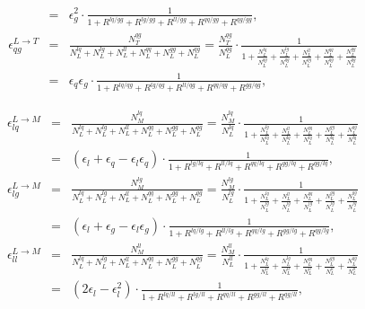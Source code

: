 \begin{eqnarray}
& = & \epsilon_{g}^{2} \cdot \frac{1}{1 + R^{lq/gg} + R^{lg/gg} + R^{ll/gg} + R^{qq/gg} + R^{qg/gg}}, \label{eq:eps15_}\\
\epsilon_{qg}^{L \rightarrow T} & = & \frac{N_{T}^{qg}}{N_{L}^{lq}+N_{L}^{lg}+N_{L}^{ll}+N_{L}^{qq}+N_{L}^{gg}+N_{L}^{qg}} =
\frac{N_{T}^{qg}}{N_{L}^{qg}} \cdot \frac{1}{1 + \frac{N_{L}^{lq}}{N_{L}^{qg}} + \frac{N_{L}^{lg}}{N_{L}^{qg}} + \frac{N_{L}^{ll}}{N_{L}^{qg}} + \frac{N_{L}^{qq}}{N_{L}^{qg}} + \frac{N_{L}^{gg}}{N_{L}^{qg}}} \nonumber \\
& = & \epsilon_{q} \epsilon_{g} \cdot \frac{1}{1 + R^{lq/qg} + R^{lg/qg} + R^{ll/qg} + R^{qq/qg} + R^{gg/qg}}, \label{eq:eps16_}
\end{eqnarray}

\begin{eqnarray}
\epsilon_{lq}^{L \rightarrow M} & = & \frac{N_{M}^{lq}}{N_{L}^{lq}+N_{L}^{lg}+N_{L}^{ll}+N_{L}^{qq}+N_{L}^{gg}+N_{L}^{qg}} =
\frac{N_{M}^{lq}}{N_{L}^{lq}} \cdot \frac{1}{1 + \frac{N_{L}^{lg}}{N_{L}^{lq}} + \frac{N_{L}^{ll}}{N_{L}^{lq}} + \frac{N_{L}^{qq}}{N_{L}^{lq}} + \frac{N_{L}^{gg}}{N_{L}^{lq}} + \frac{N_{L}^{qg}}{N_{L}^{lq}}} \nonumber \\
& = & \left( \epsilon_{l} + \epsilon_{q} - \epsilon_{l} \epsilon_{q} \right) \cdot \frac{1}{1 + R^{lg/lq} + R^{ll/lq} + R^{qq/lq} + R^{gg/lq} + R^{qg/lq}}, \label{eq:eps11_}\\
\epsilon_{lg}^{L \rightarrow M} & = & \frac{N_{M}^{lg}}{N_{L}^{lq}+N_{L}^{lg}+N_{L}^{ll}+N_{L}^{qq}+N_{L}^{gg}+N_{L}^{qg}} =
\frac{N_{M}^{lg}}{N_{L}^{lg}} \cdot \frac{1}{1 + \frac{N_{L}^{lq}}{N_{L}^{lg}} + \frac{N_{L}^{ll}}{N_{L}^{lg}} + \frac{N_{L}^{qq}}{N_{L}^{lg}} + \frac{N_{L}^{gg}}{N_{L}^{lg}} + \frac{N_{L}^{qg}}{N_{L}^{lg}}} \nonumber \\
& = & \left( \epsilon_{l} + \epsilon_{g} - \epsilon_{l} \epsilon_{g} \right) \cdot \frac{1}{1 + R^{lq/lg} + R^{ll/lg} + R^{qq/lg} + R^{gg/lg} + R^{qg/lg}}, \label{eq:eps12__}\\
\epsilon_{ll}^{L \rightarrow M} & = & \frac{N_{M}^{ll}}{N_{L}^{lq}+N_{L}^{lg}+N_{L}^{ll}+N_{L}^{qq}+N_{L}^{gg}+N_{L}^{qg}} =
\frac{N_{M}^{ll}}{N_{L}^{ll}} \cdot \frac{1}{1 + \frac{N_{L}^{lq}}{N_{L}^{ll}} + \frac{N_{L}^{lg}}{N_{L}^{ll}} + \frac{N_{L}^{qq}}{N_{L}^{ll}} + \frac{N_{L}^{gg}}{N_{L}^{ll}} + \frac{N_{L}^{qg}}{N_{L}^{ll}}} \nonumber \\
& = & \left( 2 \epsilon_{l} - \epsilon_{l}^{2} \right) \cdot \frac{1}{1 + R^{lq/ll} + R^{lg/ll} + R^{qq/ll} + R^{gg/ll} + R^{qg/ll}}, \label{eq:eps13__}\\

\end{eqnarray}
